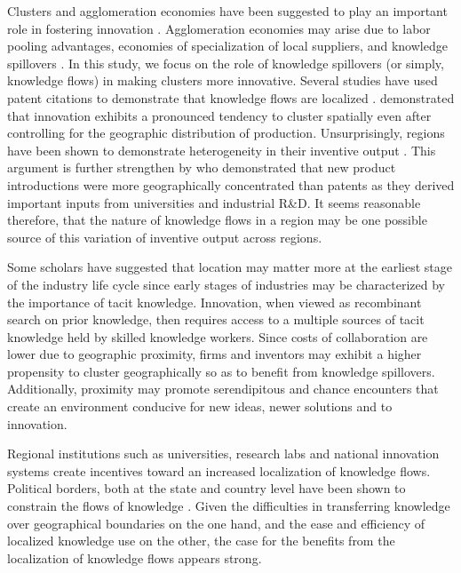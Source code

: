 \documentclass[12pt,letterpaper]{article}
\begin{document}
Clusters and agglomeration economies have been suggested to play an important role in fostering innovation \citep{Marshall1890, Porter1990}. Agglomeration economies may arise due to labor pooling advantages, economies of specialization of local suppliers, and knowledge spillovers \citep{Porter1990, Krugman1991a}.  In this study, we focus  on the role of knowledge spillovers (or simply, knowledge flows) in making clusters more innovative. Several studies have used patent citations to demonstrate that knowledge flows are localized \citep{Jaffe1993, Almeida1999}. \cite{Audretsch1996a} demonstrated that innovation exhibits a pronounced tendency to cluster spatially even after controlling for the geographic distribution of production. Unsurprisingly, regions have been shown to demonstrate heterogeneity in their inventive output \citep*{Agrawal2014b}. This argument is further strengthen by \cite*{Acs1994} who demonstrated that new product introductions were more geographically concentrated than patents as they derived important inputs from universities and industrial R\&D. It seems reasonable therefore, that the nature of knowledge flows in a region may be one possible source of this variation of inventive output across regions.\par

Some scholars have suggested that location may matter more at the earliest stage of the industry life cycle \citep{Audretsch1996b} since early stages of  industries may be characterized by the importance of tacit knowledge. Innovation, when viewed as recombinant search on prior knowledge, then requires access to a multiple sources of tacit knowledge held by skilled knowledge workers. Since costs of collaboration are lower due to geographic proximity, firms and inventors may exhibit a higher propensity to cluster geographically so as to benefit from knowledge spillovers.  Additionally, proximity may promote serendipitous and chance encounters that create an environment conducive for new ideas, newer solutions and to innovation. 

Regional institutions such as universities, research labs and national innovation systems \citep{Cooke1996, Maskell1999, Howells1996, Howells2002} create incentives toward an increased localization of knowledge flows. Political borders, both at the state and country level  have been shown to constrain the flows of knowledge \citep{Singh2013}. Given the difficulties in transferring knowledge over geographical boundaries on the one hand, and the ease and efficiency of localized knowledge use on the other, the case for the benefits from the localization of knowledge flows appears strong. \par
\end{document}
